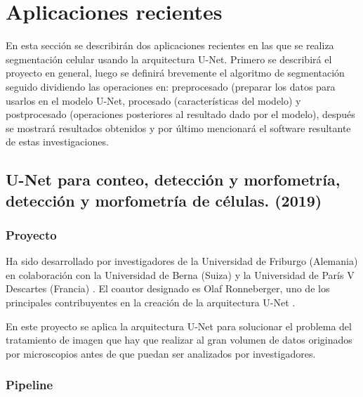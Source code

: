 \chapter{Aplicaciones recientes}\label{apps}

En esta sección se describirán dos aplicaciones recientes en las que se realiza segmentación celular usando la arquitectura U-Net. Primero se describirá el proyecto en general, luego se definirá brevemente el algoritmo de segmentación seguido dividiendo las operaciones en: preprocesado (preparar los datos para usarlos en el modelo U-Net, procesado (características del modelo) y postprocesado (operaciones posteriores al resultado dado por el modelo), después se mostrará resultados obtenidos y por último mencionará el software resultante de estas investigaciones.

\section{U-Net para conteo, detección y morfometría, detección y morfometría de células. (2019)}
\subsection{Proyecto}

Ha sido desarrollado por investigadores de la Universidad de Friburgo (Alemania) en colaboración con la Universidad de Berna (Suiza) y la Universidad de París V Descartes (Francia) \cite{Falk2019}. El coautor designado es Olaf Ronneberger, uno de los principales contribuyentes en la creación de la arquitectura U-Net \cite{Ronneberger2015}.

En este proyecto se aplica la arquitectura U-Net para solucionar el problema del tratamiento de imagen que hay que realizar al gran volumen de datos originados por microscopios antes de que puedan ser analizados por investigadores.

\subsection{Pipeline}



